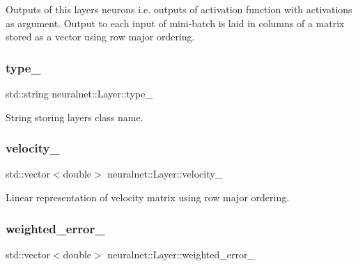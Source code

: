 Outputs of this layer\textquotesingle{}s neurons i.\+e. outputs of activation function with activations as argument. Output to each input of mini-\/batch is laid in columns of a matrix stored as a vector using row major ordering. \mbox{\label{classneuralnet_1_1Layer_a17192e2a166d6c93eab9e5cb1ae3ca8b}} 
\subsubsection{\texorpdfstring{type\+\_\+}{type\_}}
{\footnotesize\ttfamily std\+::string neuralnet\+::\+Layer\+::type\+\_\+\hspace{0.3cm}{\ttfamily [protected]}}

String storing layer\textquotesingle{}s class name. \mbox{\label{classneuralnet_1_1Layer_a4c4ae4520ce043abcb2d0b47720f37dc}} 
\subsubsection{\texorpdfstring{velocity\+\_\+}{velocity\_}}
{\footnotesize\ttfamily std\+::vector$<$double$>$ neuralnet\+::\+Layer\+::velocity\+\_\+\hspace{0.3cm}{\ttfamily [protected]}}

Linear representation of velocity matrix using row major ordering. \mbox{\label{classneuralnet_1_1Layer_a0baf6630ce4d07bd22815eedec391a72}} 
\subsubsection{\texorpdfstring{weighted\+\_\+error\+\_\+}{weighted\_error\_}}
{\footnotesize\ttfamily std\+::vector$<$double$>$ neuralnet\+::\+Layer\+::weighted\+\_\+error\+\_\+\hspace{0.3cm}{\ttfamily [protected]}}

